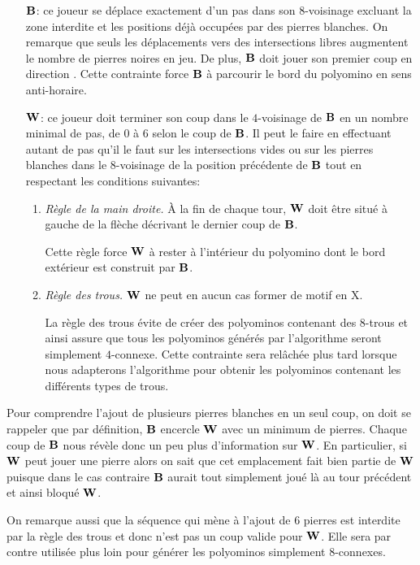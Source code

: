 \begin{itemize}
\item[$\mathbf{B}$:] ce joueur se déplace exactement d'un pas dans son $8$-voisinage excluant la zone interdite et les positions déjà occupées par des pierres blanches. On remarque que seuls les déplacements vers des intersections libres augmentent le nombre de pierres noires en jeu. De plus, $\mathbf{B}$ doit jouer son premier coup en direction . Cette contrainte force $\mathbf{B}$ à parcourir le bord du polyomino en sens anti-horaire.

\item[$\mathbf{W}$:] ce joueur doit terminer son coup dans le $4$-voisinage de $\mathbf{B}$ en un nombre minimal de pas, de $0$ à $6$ selon le coup de $\mathbf{B}$. Il peut le faire en effectuant autant de pas qu'il le faut sur les intersections vides ou sur les pierres blanches dans le $8$-voisinage de la position précédente de $\mathbf{B}$ tout en respectant les conditions suivantes:

\begin{enumerate}
\item \emph{Règle de la main droite.} À la fin de chaque tour, $\mathbf{W}$ doit être situé à gauche de la flèche décrivant le dernier coup de $\mathbf{B}$.

Cette règle force $\mathbf{W}$ à rester à l'intérieur du polyomino dont le bord extérieur est construit par $\mathbf{B}$.

\item \emph{Règle des trous.} $\mathbf{W}$ ne peut en aucun cas former de motif en X.

La règle des trous évite de créer des polyominos contenant des $8$-trous et ainsi assure que tous les polyominos générés par l'algorithme seront simplement $4$-connexe. Cette contrainte sera relâchée plus tard lorsque nous adapterons l'algorithme pour obtenir les polyominos contenant les différents types de trous.
\end{enumerate}
\end{itemize}

\vspace{-0.5em}
Pour comprendre l'ajout de plusieurs pierres blanches en un seul coup, on doit se rappeler que par définition, $\mathbf{B}$ encercle $\mathbf{W}$ avec un minimum de pierres. Chaque coup de $\mathbf{B}$ nous révèle donc un peu plus d'information sur $\mathbf{W}$. En particulier, si $\mathbf{W}$ peut jouer une pierre alors on sait que cet emplacement fait bien partie de $\mathbf{W}$ puisque dans le cas contraire $\mathbf{B}$ aurait tout simplement joué là au tour précédent et ainsi bloqué $\mathbf{W}$.

On remarque aussi que la séquence qui mène à l'ajout de 6 pierres est interdite par la règle des trous et donc n'est pas un coup valide pour $\mathbf{W}$. Elle sera par contre utilisée plus loin pour générer les polyominos simplement $8$-connexes.

